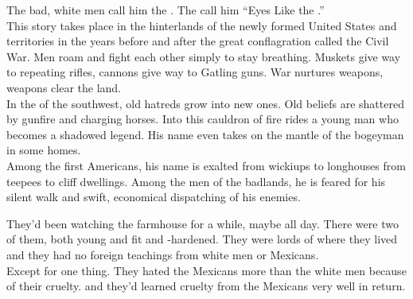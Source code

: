 
\label{album:eyes-like-the-sky}





The bad, white men call him the . The  call him ``Eyes Like the .'' \\

This story takes place in the hinterlands of the newly formed United States and territories in the years before and after the great conflagration called the Civil War. Men roam and fight each other simply to stay breathing. Muskets give way to repeating rifles, cannons give way to Gatling guns. War nurtures weapons, weapons clear the land. \\

In the  of the southwest, old hatreds grow into new ones. Old beliefs are shattered by gunfire and charging horses. Into this cauldron of fire rides a young man who becomes a shadowed legend. His name even takes on the mantle of the bogeyman in some homes. \\

Among the first Americans, his name is exalted from wickiups to longhouses from teepees to cliff dwellings. Among the men of the badlands, he is feared for his silent walk and swift, economical dispatching of his enemies. \\





They'd been watching the farmhouse for a while, maybe all day. There were two of them, both young and fit and -hardened. They were lords of where they lived and they had no foreign teachings from white men or Mexicans. \\

Except for one thing. They hated the Mexicans more than the white men because of their cruelty. and they'd learned cruelty from the Mexicans very well in return. \\

